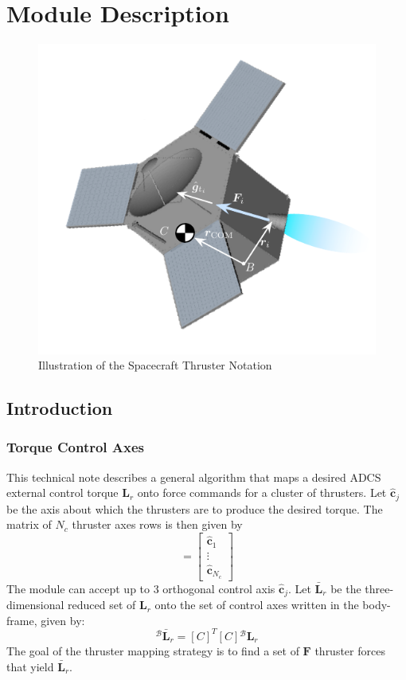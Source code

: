 \section{Module Description}
\begin{figure}[htb]
	\centerline{
	\includegraphics[]{Figures/thrusterNotation}
	}
	\caption{Illustration of the Spacecraft Thruster Notation}
	\label{fig:thruster}
\end{figure}

\subsection{Introduction}
\subsubsection{Torque Control Axes}
This technical note describes a general algorithm that maps a desired ADCS external control torque $\bm L_{r}$ onto force commands for a cluster of thrusters.  Let $\hat{\bm c}_{j}$ be the axis about which the thrusters are to produce the desired torque.  The matrix of $N_{c}$ thruster axes rows is then given by
\begin{equation}
	[C]  = \begin{bmatrix}
		\hat{\bm c}_{1} \\ \vdots \\ \hat{\bm c}_{N_{c}}
	\end{bmatrix}
\end{equation}
The module can accept up to 3 orthogonal control axis $\hat{\bm c}_{j}$.  Let $\bar{\bm L}_{r}$ be the three-dimensional reduced set of $\bm L_{r}$ onto the set of control axes written in the body-frame, given by:
\begin{equation}
	{}^{\mathcal{B}}\bar{\bm L}_{r} = [C]^{T} [C] {}^{\mathcal{B}}\bm L_{r}
\end{equation}
The goal of the thruster mapping strategy is to find a set of $\bm F$ thruster forces that yield $\bar{\bm L}_{r}$.  

